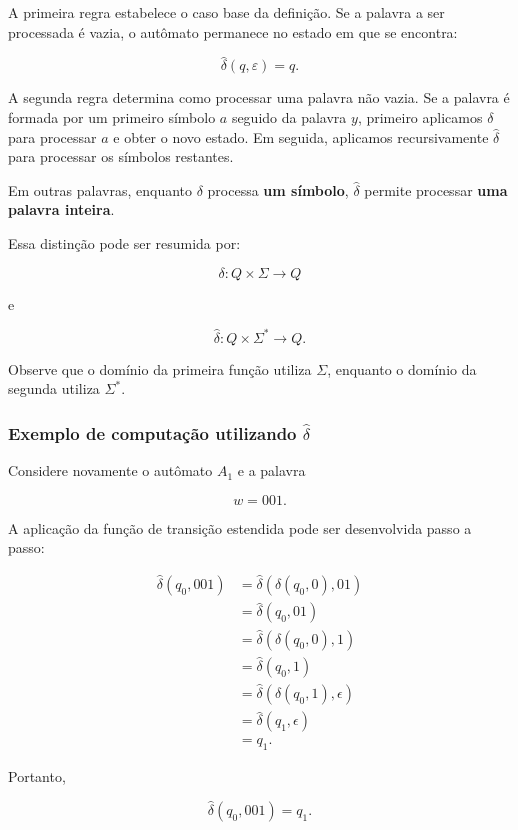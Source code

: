 \documentclass[
  brazilian,
  letterpaper,
]{book}
\theoremstyle{plain}
\theoremstyle{definition}
\theoremstyle{remark}
\begin{document}
A primeira regra estabelece o caso base da definição. Se a palavra a ser
processada é vazia, o autômato permanece no estado em que se encontra:

\[
\hat{\delta}(q,\varepsilon)=q.
\]

A segunda regra determina como processar uma palavra não vazia. Se a
palavra é formada por um primeiro símbolo \(a\) seguido da palavra
\(y\), primeiro aplicamos \(\delta\) para processar \(a\) e obter o novo
estado. Em seguida, aplicamos recursivamente \(\hat{\delta}\) para
processar os símbolos restantes.

Em outras palavras, enquanto \(\delta\) processa \textbf{um símbolo},
\(\hat{\delta}\) permite processar \textbf{uma palavra inteira}.

Essa distinção pode ser resumida por:

\[
\delta:Q\times\Sigma\rightarrow Q
\]

e

\[
\hat{\delta}:Q\times\Sigma^*\rightarrow Q.
\]

Observe que o domínio da primeira função utiliza \(\Sigma\), enquanto o
domínio da segunda utiliza \(\Sigma^*\).

\subsubsection{\texorpdfstring{Exemplo de computação utilizando
\(\hat{\delta}\)}{Exemplo de computação utilizando \textbackslash hat\{\textbackslash delta\}}}\label{exemplo-de-computauxe7uxe3o-utilizando-hatdelta}

Considere novamente o autômato \(A_1\) e a palavra

\[
w=001.
\]

A aplicação da função de transição estendida pode ser desenvolvida passo
a passo:

\[
\begin{aligned}
\hat{\delta}(q_0,001)
&=\hat{\delta}(\delta(q_0,0),01)\\
&=\hat{\delta}(q_0,01)\\
&=\hat{\delta}(\delta(q_0,0),1)\\
&=\hat{\delta}(q_0,1)\\
&=\hat{\delta}(\delta(q_0,1),\epsilon)\\
&=\hat{\delta}(q_1,\epsilon)\\
&=q_1.
\end{aligned}
\]

Portanto,

\[
\boxed{\hat{\delta}(q_0,001)=q_1}.
\]
\end{document}

